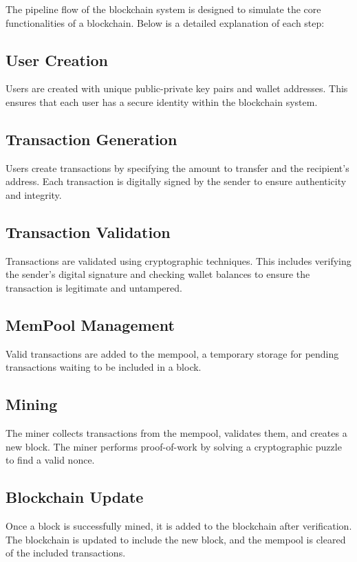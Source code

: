 \documentclass[12pt]{article}
\begin{document}
The pipeline flow of the blockchain system is designed to simulate the core functionalities of a blockchain. Below is a detailed explanation of each step:

\subsection{User Creation}
Users are created with unique public-private key pairs and wallet addresses. This ensures that each user has a secure identity within the blockchain system.

\subsection{Transaction Generation}
Users create transactions by specifying the amount to transfer and the recipient's address. Each transaction is digitally signed by the sender to ensure authenticity and integrity.

\subsection{Transaction Validation}
Transactions are validated using cryptographic techniques. This includes verifying the sender's digital signature and checking wallet balances to ensure the transaction is legitimate and untampered.

\subsection{MemPool Management}
Valid transactions are added to the mempool, a temporary storage for pending transactions waiting to be included in a block.

\subsection{Mining}
The miner collects transactions from the mempool, validates them, and creates a new block. The miner performs proof-of-work by solving a cryptographic puzzle to find a valid nonce.

\subsection{Blockchain Update}
Once a block is successfully mined, it is added to the blockchain after verification. The blockchain is updated to include the new block, and the mempool is cleared of the included transactions.
\end{document}
